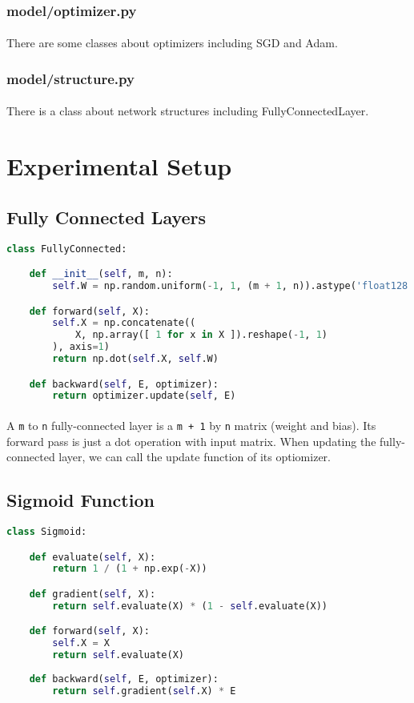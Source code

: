 \subsubsection{model/optimizer.py}
\paragraph{}
There are some classes about optimizers including SGD and Adam.
\subsubsection{model/structure.py}
\paragraph{}
There is a class about network structures including FullyConnectedLayer.
\section{Experimental Setup}
\subsection{Fully Connected Layers}
\begin{lstlisting}[language=Python]
class FullyConnected:

    def __init__(self, m, n):
        self.W = np.random.uniform(-1, 1, (m + 1, n)).astype('float128')

    def forward(self, X):
        self.X = np.concatenate((
            X, np.array([ 1 for x in X ]).reshape(-1, 1)
        ), axis=1)
        return np.dot(self.X, self.W)

    def backward(self, E, optimizer):
        return optimizer.update(self, E)
\end{lstlisting}
\paragraph{}
A \texttt{m} to \texttt{n} fully-connected layer is a \texttt{m + 1} by \texttt{n} matrix (weight and bias). Its forward pass is just a dot operation with input matrix. When updating the fully-connected layer, we can call the update function of its optiomizer.
\subsection{Sigmoid Function}
\begin{lstlisting}[language=Python]
class Sigmoid:

    def evaluate(self, X):
        return 1 / (1 + np.exp(-X))

    def gradient(self, X):
        return self.evaluate(X) * (1 - self.evaluate(X))

    def forward(self, X):
        self.X = X
        return self.evaluate(X)
        
    def backward(self, E, optimizer):
        return self.gradient(self.X) * E
\end{lstlisting}
